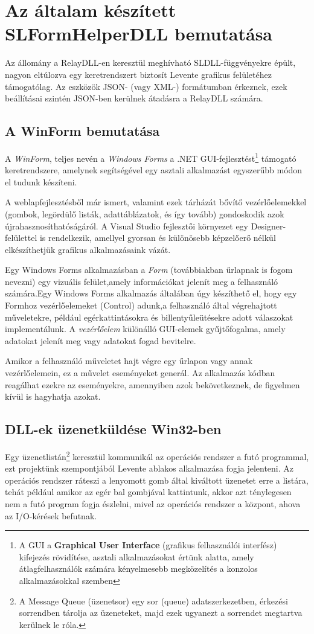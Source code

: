 \documentclass[tocnopagenum]{thesis-ekf}
\theoremstyle{definition}
\theoremstyle{remark}
\begin{document}
	\section{Az általam készített SLFormHelperDLL bemutatása}
	Az állomány a RelayDLL-en keresztül meghívható SLDLL-függvényekre épült, nagyon eltúlozva egy keretrendszert biztosít Levente grafikus felületéhez támogatólag. Az eszközök JSON- (vagy XML-) formátumban érkeznek, ezek beállításai szintén JSON-ben kerülnek átadásra a RelayDLL számára.
	
	

	\subsection{A WinForm bemutatása}
	A \textit{WinForm}, teljes nevén a \textit{Windows Forms} a .NET GUI-fejlesztést\footnote{A GUI a \textbf{Graphical User Interface} (grafikus felhasználói interfész) kifejezés rövidítése, asztali alkalmazásokat értünk alatta, amely átlagfelhasználók számára kényelmesebb megközelítés a konzolos alkalmazásokkal szemben} támogató keretrendszere, amelynek segítségével egy asztali alkalmazást egyszerűbb módon el tudunk készíteni. 
	
	A weblapfejlesztésből már ismert, valamint ezek tárházát bővítő vezérlőelemekkel (gombok, legördülő listák, adattáblázatok, és így tovább) gondoskodik azok újrahasznosíthatóságáról. A Visual Studio fejlesztői környezet egy Designer-felülettel is rendelkezik, amellyel gyorsan és különösebb képzelőerő nélkül elkészíthetjük grafikus alkalmazásaink vázát.
	
	Egy Windows Forms alkalmazásban a \textit{Form} (továbbiakban űrlapnak is fogom nevezni) egy vizuális felület,amely információkat jelenít meg a felhasználó számára.Egy Windows Forms alkalmazás általában úgy készíthető el, hogy egy Formhoz vezérlőelemeket (Control) adunk,a felhasználó által végrehajtott műveletekre, például egérkattintásokra és billentyűleütésekre adott válaszokat implementálunk. A \textit{vezérlőelem} különálló GUI-elemek gyűjtőfogalma, amely adatokat jelenít meg vagy adatokat fogad bevitelre.
	
	Amikor a felhasználó műveletet hajt végre egy űrlapon vagy annak vezérlőelemein, ez a művelet eseményeket generál. Az alkalmazás kódban reagálhat ezekre az eseményekre, amennyiben azok bekövetkeznek, de figyelmen kívül is hagyhatja azokat.\cite{winform}
	\subsection{DLL-ek üzenetküldése Win32-ben}
	Egy üzenetlistán\footnote{A Message Queue (üzenetsor) egy sor (queue) adatszerkezetben, érkezési sorrendben tárolja az üzeneteket, majd ezek ugyanezt a sorrendet megtartva kerülnek le róla.} keresztül kommunikál az operációs rendszer a futó programmal, ezt projektünk szempontjából Levente ablakos alkalmazása fogja jelenteni. Az operációs rendszer ráteszi a lenyomott gomb által kiváltott üzenetet erre a listára, tehát például amikor az egér bal gombjával kattintunk, akkor azt ténylegesen nem a futó program fogja észlelni, mivel az operációs rendszer a központ, ahova az I/O-kérések befutnak. 
	
\end{document}
